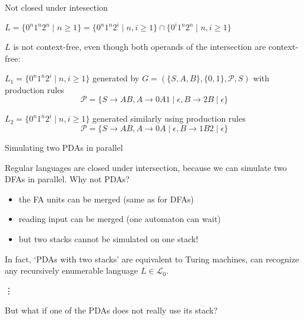 \documentclass[handout]{beamer}
\begin{document}
\begin{frame}{Not closed under intesection}

    \begin{example}
        $L=\{0^n1^n2^n \mid n\geq 1\}=\{0^n1^n2^i \mid n,i\geq 1\}\cap \{0^i1^n2^n \mid n,i\geq 1\}$
    \end{example}

    $L$ is not context-free, even though both operands of the intersection are context-free:
 
    $L_1=\{0^n1^n2^i\mid n,i\geq 1\}$ generated by $G=(\{S,A,B\},\{0,1\},\mathcal P,S)$ with production rules 
    $$
    \mathcal P=\{S\rightarrow AB, A\rightarrow 0A1\mid\epsilon, B\rightarrow 2B\mid\epsilon \}
    $$
        
    $L_2=\{0^n1^n2^i \mid n,i\geq 1\}$ generated similarly using production rules 
    $$
    \mathcal P=\{S\rightarrow AB, A\rightarrow 0A\mid\epsilon, B\rightarrow 1B2\mid\epsilon \}
    $$

\end{frame}


\begin{frame}{Simulating two PDAs in parallel}

    Regular languages are closed under intersection, because we can simulate two DFAs in parallel. Why not PDAs?

    \begin{itemize}
        \item the FA units can be merged (same as for DFAs)
        \item reading input can be merged (one automaton can wait)
        \item but two stacks cannot be simulated on one stack!
    \end{itemize}
        
    In fact, `PDAs with two stacks' are equivalent to \alert{Turing machines}, can recognize any \alert{recursively enumerable} language $L\in{\mathcal L}_0$.

    \medskip
    \vdots
    \medskip

    But what if one of the PDAs does not really use its stack?

\end{frame}
\end{document}

